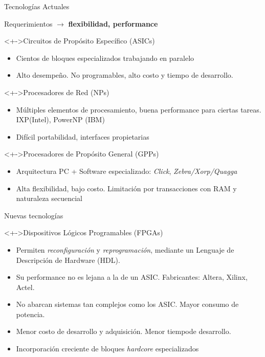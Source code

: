 \documentclass[xcolor=dvipsnames]{beamer}
\begin{document}
\begin {frame}{Tecnologías Actuales}   
  
  Requerimientos $\rightarrow$ {\bf flexibilidad, performance} 
  
  \begin{block}<+->{Circuitos de Propósito Específico (ASICs)} 
    \begin{itemize}
      \scriptsize
      \item Cientos de bloques especializados trabajando en paralelo
      \item Alto desempeño. No programables, alto costo y tiempo de desarrollo.
    \end{itemize}
  \end{block}

  \begin{block}<+->{Procesadores de Red (NPs)}   
    \begin{itemize}
      \scriptsize
      \item Múltiples elementos de procesamiento, buena performance para ciertas tareas. IXP(Intel), PowerNP (IBM)
      \item Difícil portabilidad, interfaces propietarias
    \end{itemize}
  \end{block}

  \begin{block}<+->{Procesadores de Propósito General (GPPs)} 
    \begin{itemize}
      \scriptsize
      \item Arquitectura PC + Software especializado: \emph{Click}, \emph{Zebra/Xorp/Quagga}
      \item Alta flexibilidad, bajo costo. Limitación por transacciones con RAM y naturaleza secuencial
    \end{itemize}
  \end{block}
  
\end{frame}


\begin{frame}{Nuevas tecnologías}

  \begin{block}<+->{Dispositivos Lógicos Programables (FPGAs)} 
    \begin{itemize}
      \scriptsize
      \item Permiten \emph{reconfiguración} y \emph{reprogramación}, mediante un Lenguaje de Descripción de Hardware (HDL).
      \item Su performance no es lejana a la de un ASIC. Fabricantes: Altera, Xilinx, Actel.
      \item No abarcan sistemas tan complejos como los ASIC. Mayor consumo de potencia.
      \item Menor costo de desarrollo y adquisición. Menor tiempode desarrollo.
      \item Incorporación creciente de bloques \emph{hardcore} especializados
    \end{itemize}

  \end{block}  
\end{frame}
\end{document}
